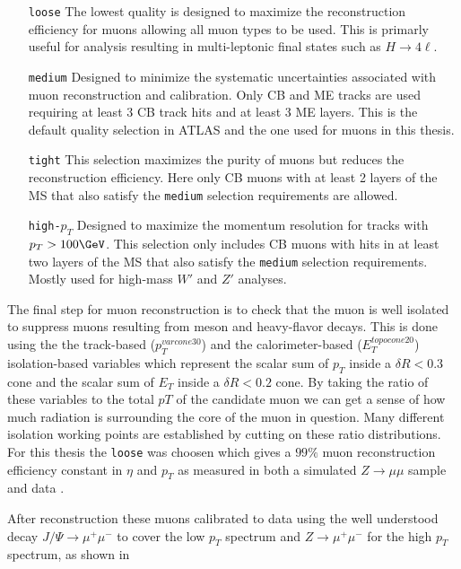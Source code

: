\begin{enumerate}
  \item[\texttt{loose}] The lowest quality is designed to maximize the reconstruction efficiency for muons allowing all muon types to be used.  This is primarly useful for analysis resulting in multi-leptonic final states such as $H \rightarrow 4\ell$.
  \item[\texttt{medium}] Designed to minimize the systematic uncertainties associated with muon reconstruction and calibration.  Only CB and ME tracks are used requiring at least 3 CB track hits and at least 3 ME layers.  This is the default quality selection in ATLAS and the one used for muons in this thesis.
  \item[\texttt{tight}] This selection maximizes the purity of muons but reduces the reconstruction efficiency. Here only CB muons with at least 2 layers of the MS that also satisfy the \texttt{medium} selection requirements are allowed.
  \item[\texttt{high-$p_{T}$}] Designed to maximize the momentum resolution for tracks with $p_{T} > 100 \GeV$.  This selection only includes CB muons with hits in at least two layers of the MS that also satisfy the \texttt{medium} selection requirements.  Mostly used for high-mass $W'$ and $Z'$ analyses.
\end{enumerate}

The final step for muon reconstruction is to check that the muon is well
isolated to suppress muons resulting from meson and heavy-flavor decays. This
is done using the the track-based ($p_{T}^{varcone30}$) and the
calorimeter-based ($E_{T}^{topocone20}$) isolation-based variables which
represent the scalar sum of $p_{T}$ inside a $\delta R < 0.3$ cone and the
scalar sum of $E_{T}$ inside a $\delta R < 0.2$ cone.  By taking the ratio of
these variables to the total $p{T}$ of the candidate muon we can get a sense of
how much radiation is surrounding the core of the muon in question. Many
different isolation working points are established by cutting on these ratio
distributions. For this thesis the \texttt{loose} was choosen which gives a
$99\%$ muon reconstruction efficiency constant in $\eta$ and $p_{T}$ as
measured in both a simulated $Z \rightarrow \mu\mu$ sample and data \cite{Aad:2016jkr}.

After reconstruction these muons calibrated to data using the well understood
decay $J/\Psi \rightarrow \mu^{+}\mu^{-}$ to cover the low $p_{T}$ spectrum and
$Z \rightarrow \mu^{+}\mu^{-}$ for the high $p_{T}$ spectrum, as shown in 

